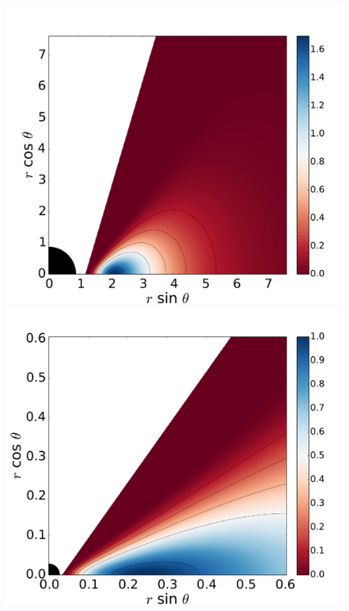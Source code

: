 \documentclass[twocolumn,aps,showpacs,showkeys,prd,superscriptaddress,byrevtex, amsmath]{revtex4-1}
\begin{document}
\begin{figure}
\includegraphics[scale=0.14]{figures/fig9_09__10.pdf}
\\
\includegraphics[scale=0.14]{figures/fig9_09999_10.pdf}
\hspace{-0.3cm}

\end{figure}
\end{document}
